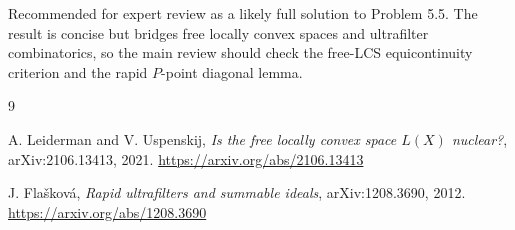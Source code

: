 \documentclass[11pt]{article}
\begin{document}
Recommended for expert review as a likely full solution to Problem 5.5. The
result is concise but bridges free locally convex spaces and ultrafilter
combinatorics, so the main review should check the free-LCS equicontinuity
criterion and the rapid \(P\)-point diagonal lemma.

\begin{thebibliography}{9}

A. Leiderman and V. Uspenskij,
\emph{Is the free locally convex space \(L(X)\) nuclear?},
arXiv:2106.13413, 2021.
\url{https://arxiv.org/abs/2106.13413}

J. Fla\v{s}kov\'a,
\emph{Rapid ultrafilters and summable ideals},
arXiv:1208.3690, 2012.
\url{https://arxiv.org/abs/1208.3690}

\end{thebibliography}
\end{document}
